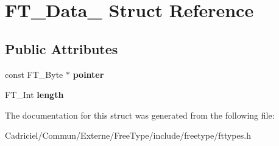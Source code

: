 \hypertarget{struct_f_t___data__}{}\section{F\+T\+\_\+\+Data\+\_\+ Struct Reference}
\label{struct_f_t___data__}
\subsection*{Public Attributes}
\begin{DoxyCompactItemize}
\item 
const F\+T\+\_\+\+Byte $\ast$ {\bfseries pointer}\hypertarget{struct_f_t___data___a4dea731b8a256b973757e1b8f612b050}{}\label{struct_f_t___data___a4dea731b8a256b973757e1b8f612b050}

\item 
F\+T\+\_\+\+Int {\bfseries length}\hypertarget{struct_f_t___data___af60c89dccd1852aceb0dc08675aca2fd}{}\label{struct_f_t___data___af60c89dccd1852aceb0dc08675aca2fd}

\end{DoxyCompactItemize}


The documentation for this struct was generated from the following file\+:\begin{DoxyCompactItemize}
\item 
Cadriciel/\+Commun/\+Externe/\+Free\+Type/include/freetype/fttypes.\+h\end{DoxyCompactItemize}
